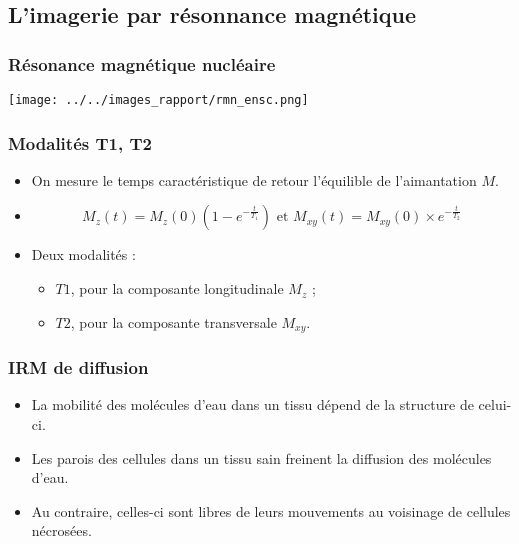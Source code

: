 \subsection{L'imagerie par r\'esonnance magn\'etique}



\begin{frame}
\frametitle{R\'esonance magn\'etique nucl\'eaire}
\texttt{[image: ../../images\_rapport/rmn\_ensc.png]}
\end{frame}

\begin{frame}
\frametitle{Modalit\'es T1, T2}
\begin{itemize}
\item<+-> On mesure le temps caract\'eristique de retour  l'\'equilible de l'aimantation $M$.
\item<+-> \[M_z(t)=M_z(0)\left(1-e^{-\frac{t}{T_1}}\right)\text{ et }M_{xy}(t)=M_{xy}(0)\times e^{-\frac{t}{T_2}}\]
\item<+-> Deux modalit\'es :
\begin{itemize}
\item<+-> $T1$, pour la composante longitudinale $M_z$ ;
\item<+-> $T2$, pour la composante transversale $M_{xy}$.
\end{itemize}
\end{itemize}
\end{frame}

\subsubsection{IRM de diffusion}
\begin{frame}
\begin{itemize}
\item<+-> La mobilit\'e des mol\'ecules d'eau dans un tissu d\'epend de la structure de celui-ci.
\item<+-> Les parois des cellules dans un tissu sain freinent la diffusion des mol\'ecules d'eau.
\item<+-> Au contraire, celles-ci sont libres de leurs mouvements au voisinage de cellules n\'ecros\'ees.
\end{itemize}
\end{frame}

